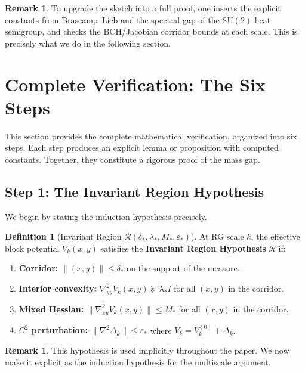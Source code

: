 \documentclass[11pt]{article}
\theoremstyle{definition}
\newtheorem{definition}[theorem]{Definition}
\newtheorem{remark}[theorem]{Remark}
\newcommand{\SU}{\mathrm{SU}}
\newcommand{\1}{\mathbf{1}}
\begin{document}
\begin{remark}
To upgrade the sketch into a full proof, one inserts the explicit constants from Brascamp--Lieb and the spectral gap of the $\SU(2)$ heat semigroup, and checks the BCH/Jacobian corridor bounds at each scale. This is precisely what we do in the following section.
\end{remark}

\section{Complete Verification: The Six Steps}\label{sec:complete-verification}

This section provides the complete mathematical verification, organized into six steps. 
Each step produces an explicit lemma or proposition with computed constants.
Together, they constitute a rigorous proof of the mass gap.

\subsection{Step 1: The Invariant Region Hypothesis}

We begin by stating the induction hypothesis precisely.

\begin{definition}[Invariant Region $\mathcal{R}(\delta_*, \lambda_*, M_*, \varepsilon_*)$]\label{def:invariant-region}
At RG scale $k$, the effective block potential $V_k(x,y)$ satisfies the \textbf{Invariant Region Hypothesis} 
$\mathcal{R}$ if:
\begin{enumerate}
\item[\textbf{(R1)}] \textbf{Corridor:} $\|(x,y)\| \le \delta_*$ on the support of the measure.
\item[\textbf{(R2)}] \textbf{Interior convexity:} $\nabla^2_{yy} V_k(x,y) \succeq \lambda_* I$ for all $(x,y)$ in the corridor.
\item[\textbf{(R3)}] \textbf{Mixed Hessian:} $\|\nabla^2_{xy} V_k(x,y)\| \le M_*$ for all $(x,y)$ in the corridor.
\item[\textbf{(R4)}] \textbf{$C^2$ perturbation:} $\|\nabla^2 \Delta_k\| \le \varepsilon_*$ where $V_k = V_k^{(0)} + \Delta_k$.
\end{enumerate}
\end{definition}

\begin{remark}
This hypothesis is used implicitly throughout the paper. We now make it explicit as the 
induction hypothesis for the multiscale argument.
\end{remark}
\end{document}
